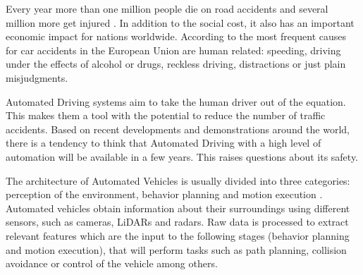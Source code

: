 
Every year more than one million people die on road accidents and several 
million more get injured \cite{world2015global}. In addition to the social cost, it also has an
important economic impact for nations worldwide. According to 
\cite{Thomas2013} the most frequent causes for car accidents in the
European Union are human related: speeding, driving under the effects of
alcohol or drugs, reckless driving, distractions or just plain misjudgments.

Automated Driving systems aim to take the human driver out of the equation. 
This makes them a tool with the potential to reduce the number of traffic 
accidents.
Based on recent developments and demonstrations around the world, there is a 
tendency to think that Automated Driving with a high level of automation will 
be available in a few years. This raises questions about its safety. 
%

The architecture of Automated Vehicles is usually divided into three 
categories: perception of the environment, behavior planning and motion 
execution \cite{behere2015functional}. Automated 
vehicles obtain information about their surroundings using different
sensors, such as cameras, LiDARs and radars. Raw data is processed to extract
relevant features which are the input to the following stages (behavior
planning and motion execution), that will perform tasks such as path planning,
collision avoidance or control of the vehicle among others. 

